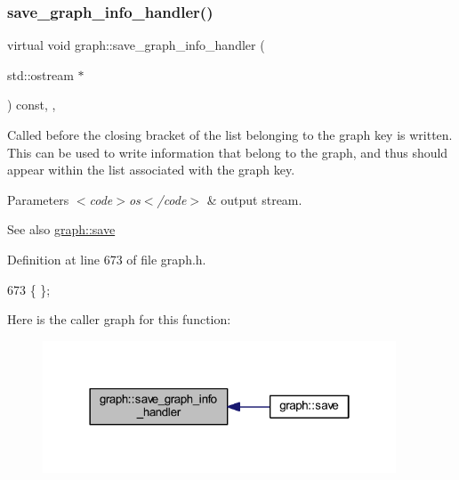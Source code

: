 \subsubsection{\texorpdfstring{save\+\_\+graph\+\_\+info\+\_\+handler()}{save\_graph\_info\_handler()}}
{\footnotesize\ttfamily virtual void graph\+::save\+\_\+graph\+\_\+info\+\_\+handler (\begin{DoxyParamCaption}\item[{std\+::ostream $\ast$}]{ }\end{DoxyParamCaption}) const\hspace{0.3cm}{\ttfamily [inline]}, {\ttfamily [virtual]}, {\ttfamily [inherited]}}

Called before the closing bracket of the list belonging to the graph key is written. This can be used to write information that belong to the graph, and thus should appear within the list associated with the graph key.


\begin{DoxyParams}{Parameters}
{\em $<$code$>$os$<$/code$>$} & output stream. \\
\hline
\end{DoxyParams}
\begin{DoxySeeAlso}{See also}
\mbox{\hyperlink{classgraph_a7bd0712a528249d1585085a64ac3e661}{graph\+::save}} 
\end{DoxySeeAlso}


Definition at line 673 of file graph.\+h.


\begin{DoxyCode}
673 \{ \};
\end{DoxyCode}
Here is the caller graph for this function\+:
\nopagebreak
\begin{figure}[H]
\begin{center}
\leavevmode
\includegraphics[width=298pt]{classgraph_a0f20022d6f4951b8836a204aa85b7693_icgraph}
\end{center}
\end{figure}
\mbox{\label{class_my_graph_ad5f4b3ce70135723fe08a301d20c4a8a}} 

